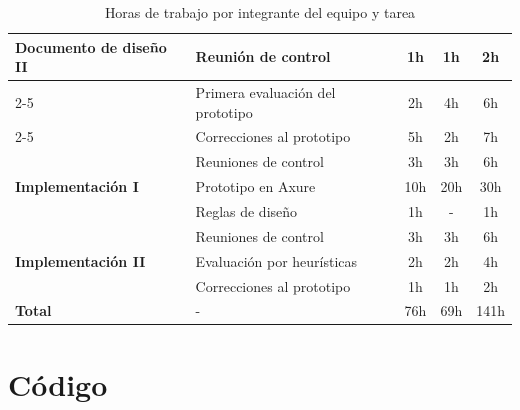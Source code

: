 \documentclass[11pt]{article}
\begin{document}
\begin{table}[h!]
\begin{tabular}{|p{5cm}|p{5cm}|c|c|c|}
        \hline
        \multirow{4}{*}{\textbf{Documento de diseño II}} & Reunión de control & 1h & 1h & 2h \\
        \cline{2-5}
                                                         & Primera evaluación del prototipo & 2h & 4h & 6h \\
        \cline{2-5}
                                                         &  Correcciones al prototipo & 5h & 2h & 7h \\
        \hline
        \multirow{3}{*}{\textbf{Implementación I}} & Reuniones de control & 3h & 3h & 6h \\
        \cline{2-5}
                                                   & Prototipo en Axure & 10h & 20h & 30h \\
        \cline{2-5}
                                                   & Reglas de diseño & 1h & - & 1h \\
        \hline
    
        \multirow{3}{*}{\textbf{Implementación II}} & Reuniones de control & 3h & 3h & 6h \\
        \cline{2-5}
                                                    & Evaluación por heurísticas  & 2h & 2h & 4h \\
        \cline{2-5}
                                                    & Correcciones al prototipo & 1h & 1h & 2h \\
        \toprule
        \bottomrule
        \textbf{Total} & -  & 76h & 69h & 141h \\
        \toprule
    \end{tabular}
    \caption{Horas de trabajo por integrante del equipo y tarea}
\end{table}

\newpage

\section{Código}
\end{document}
